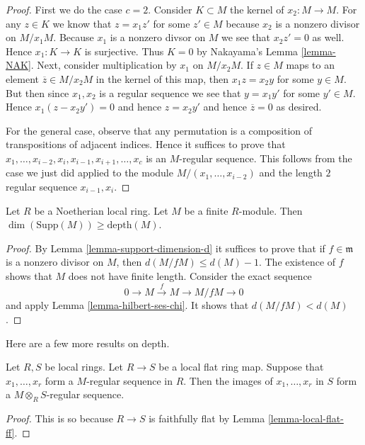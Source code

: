 \begin{proof}
First we do the case $c = 2$.
Consider $K \subset M$ the kernel of $x_2 : M \to M$.
For any $z \in K$ we know that $z = x_1 z'$
for some $z' \in M$ because
$x_2$ is a nonzero divisor on $M/x_1M$.
Because $x_1$ is a nonzero divsor on $M$ we see that $x_2 z' = 0$
as well. Hence $x_1 : K \to K$ is surjective.
Thus $K = 0$ by Nakayama's Lemma \ref{lemma-NAK}.
Next, consider multiplication by $x_1$ on $M/x_2M$.
If $z \in M$ maps to an element $\overline{z} \in M/x_2M$
in the kernel of this map, then $x_1 z = x_2 y$ for some $y \in M$.
But then since $x_1, x_2$ is a regular sequence we see that
$y = x_1 y'$ for some $y' \in M$. Hence $x_1 ( z - x_2 y' ) =0$
and hence $z = x_2 y'$ and hence $\overline{z} = 0$ as desired.

\medskip\noindent
For the general case, observe that any permutation is
a composition of transpositions of adjacent indices.
Hence it suffices to prove that
$x_1, \ldots, x_{i-2}, x_i, x_{i-1}, x_{i + 1}, \ldots, x_c$
is an $M$-regular sequence. This follows from the case we
just did applied to the module $M/(x_1, \ldots, x_{i-2})$
and the length $2$ regular sequence $x_{i-1}, x_i$.
\end{proof}

\begin{lemma}
\label{lemma-bound-depth}
Let $R$ be a Noetherian local ring.
Let $M$ be a finite $R$-module.
Then $\dim(\text{Supp}(M)) \geq \text{depth}(M)$.
\end{lemma}

\begin{proof}
By Lemma \ref{lemma-support-dimension-d} it suffices
to prove that if $f \in \mathfrak m$ is a nonzero
divisor on $M$, then $d(M/fM) \leq d(M) - 1$.
The existence of $f$ shows that $M$ does not have finite length.
Consider the exact sequence
$$
0 \to M \xrightarrow{f} M \to M/fM \to 0
$$
and apply Lemma \ref{lemma-hilbert-ses-chi}.
It shows that $d(M/fM) < d(M)$.
\end{proof}

\noindent
Here are a few more results on depth.

\begin{lemma}
\label{lemma-flat-increases-depth}
Let $R, S$ be local rings.
Let $R \to S$ be a local flat ring map.
Suppose that $x_1, \ldots, x_r$ form
a $M$-regular sequence in $R$.
Then the images of $x_1, \ldots, x_r$ in
$S$ form a $M\otimes_RS$-regular sequence.
\end{lemma}

\begin{proof}
This is so because $R\to S$ is faithfully flat
by Lemma \ref{lemma-local-flat-ff}.
\end{proof}

